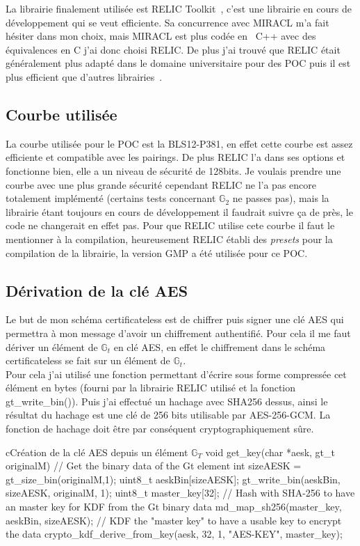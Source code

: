 La librairie finalement utilisée est RELIC Toolkit~\cite{relic-toolkit}, c'est une librairie en cours de développement qui se veut efficiente. Sa concurrence avec MIRACL m'a fait hésiter dans mon choix, mais MIRACL est plus codée en~ C++ avec des équivalences en C j'ai donc choisi RELIC. De plus j'ai trouvé que RELIC était généralement plus adapté dans le domaine universitaire pour des POC puis il est plus efficient que d'autres librairies~\cite{performanceRELIC}.
\subsection{Courbe utilisée}
La courbe utilisée pour le POC est la BLS12-P381, en effet cette courbe est assez efficiente et compatible avec les pairings. De plus RELIC l'a dans ses options et fonctionne bien, elle a un niveau de sécurité de 128bits. Je voulais prendre une courbe avec une plus grande sécurité cependant RELIC ne l'a pas encore totalement implémenté (certains tests concernant $\mathbb{G}_2$ ne passes pas), mais la librairie étant toujours en cours de développement il faudrait suivre ça de près, le code ne changerait en effet pas. Pour que RELIC utilise cete courbe il faut le mentionner à la compilation, heureusement RELIC établi des \textit{presets} pour la compilation de la librairie, la version GMP a été utilisée pour ce POC.

\subsection{Dérivation de la clé AES}
Le but de mon schéma certificateless est de chiffrer puis signer une clé AES qui permettra à mon message d'avoir un chiffrement authentifié. Pour cela il me faut dériver un élément de $\mathbb{G}_t$ en clé AES, en effet le chiffrement dans le schéma certificateless se fait sur un élément de $\mathbb{G}_t$.\\
Pour cela j'ai utilisé une fonction permettant d'écrire sous forme compressée cet élément en bytes (fourni par la librairie RELIC utilisé et la fonction gt\_write\_bin()). Puis j'ai effectué un hachage avec SHA256 dessus, ainsi le résultat du hachage est une clé de 256 bits utilisable par AES-256-GCM. La fonction de hachage doit être par conséquent cryptographiquement sûre.

\begin{sourcebox}{c}{Création de la clé AES depuis un élément $\mathbb{G}_T$}
	void get_key(char *aesk, gt_t originalM) {
		// Get the binary data of the Gt element
		int sizeAESK = gt_size_bin(originalM,1);
		uint8_t aeskBin[sizeAESK];
		gt_write_bin(aeskBin, sizeAESK, originalM, 1);
		uint8_t master_key[32];
		// Hash with SHA-256 to have an master key for KDF from the Gt binary data
		md_map_sh256(master_key, aeskBin, sizeAESK);
		// KDF the "master key" to have a usable key to encrypt the data
		crypto_kdf_derive_from_key(aesk, 32, 1, "AES-KEY", master_key);
	}
\end{sourcebox}

